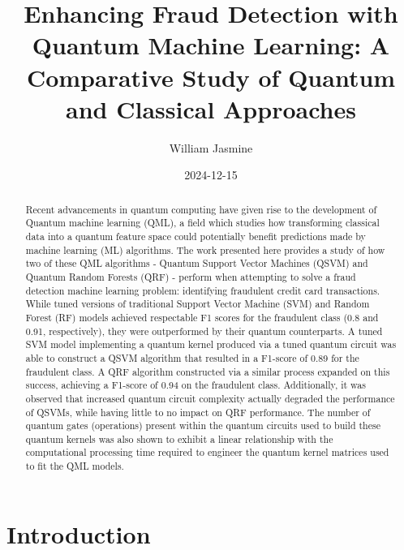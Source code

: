 \documentclass[11pt, oneside]{article}   	%
\title{Enhancing Fraud Detection with Quantum Machine Learning: A Comparative Study of Quantum and Classical Approaches}
\author{William Jasmine}
\date{2024-12-15}							%
\begin{document}
\maketitle




\begin{abstract}

Recent advancements in quantum computing have given rise to the development of Quantum machine learning (QML), a field which studies how transforming classical data into a quantum feature space could potentially benefit predictions made by machine learning (ML) algorithms. The work presented here provides a study of how two of these QML algorithms - Quantum Support Vector Machines (QSVM) and Quantum Random Forests (QRF) - perform when attempting to solve a fraud detection machine learning problem: identifying fraudulent credit card transactions. While tuned versions of traditional Support Vector Machine (SVM) and Random Forest (RF) models achieved respectable F1 scores for the fraudulent class (0.8 and 0.91, respectively), they were outperformed by their quantum counterparts. A tuned SVM model implementing a quantum kernel produced via a tuned quantum circuit was able to construct a QSVM algorithm that resulted in a F1-score of 0.89 for the fraudulent class. A QRF algorithm constructed via a similar process expanded on this success, achieving a F1-score of 0.94 on the fraudulent class. Additionally, it was observed that increased quantum circuit complexity actually degraded the performance of QSVMs, while having little to no impact on QRF performance. The number of quantum gates (operations) present within the quantum circuits used to build these quantum kernels was also shown to exhibit a linear relationship with the computational processing time required to engineer the quantum kernel matrices used to fit the QML models.

\end{abstract}
\newpage



\section{Introduction}
\end{document}
